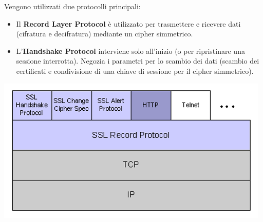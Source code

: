             Vengono utilizzati due protocolli principali:
            \begin{itemize}
                \item Il \textbf{Record Layer Protocol} è utilizzato per trasmettere e ricevere dati (cifratura e decifratura) mediante un cipher simmetrico.
                \item L'\textbf{Handshake Protocol} interviene solo all'inizio (o per ripristinare una sessione interrotta). Negozia i parametri per lo scambio dei dati (scambio dei certificati e condivisione di una chiave di sessione per il cipher simmetrico).
            \end{itemize}

            \begin{center}
                \includegraphics[scale=0.6]{chapters/7/assets/schema_ze.png}
            \end{center}

